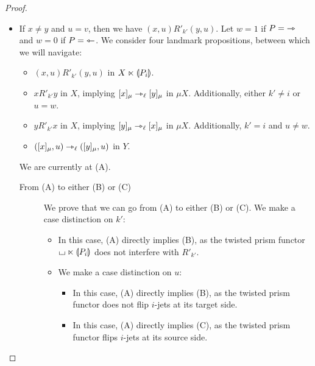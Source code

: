 \documentclass[a4paper]{memoir}
\begin{document}
\begin{proof}
\begin{enumerate}
\begin{itemize}
\begin{itemize}
				\item If $x \neq y$ and $u = v$, then we have $(x, u) \mathrel{R'_{k'}} (y, u)$.
				Let $w = 1$ if $P = {\rightarrowtriangle}$ and $w = 0$ if $P = {\leftarrowtriangle}$.
				We consider four landmark propositions, between which we will navigate:
				\begin{itemize}
					\item[\textbf{(A)}] $(x, u) \mathrel{R'_{k'}} (y, u)$ in $X \ltimes {\llparenthesis P_i \rrparenthesis}$.
					\item[\textbf{(B)}] $x \mathrel{R'_{k'}} y$ in $X$, implying $[x]_\mu \rightarrowtriangle_\ell [y]_\mu$ in $\mu X$. Additionally, either $k' \neq i$ or $u = w$.
					\item[\textbf{(C)}] $y \mathrel{R'_{k'}} x$ in $X$, implying $[y]_\mu \rightarrowtriangle_\ell [x]_\mu$ in $\mu X$. Additionally, $k' = i$ and $u \neq w$.
					\item[\textbf{(D)}] $([x]_\mu, u) \rightarrowtriangle_\ell ([y]_\mu, u)$ in $Y$.
				\end{itemize}
				We are currently at (A).
				\begin{description}
					\item[From (A) to either (B) or (C)]
					We prove that we can go from (A) to either (B) or (C).
					We make a case distinction on $k'$:
					\begin{itemize}
						\item[\framebox{$k' \neq i$}] In this case, (A) directly implies (B), as the twisted prism functor ${\llcorner\hspace{-.4ex}\lrcorner} \ltimes {\llparenthesis P_i \rrparenthesis}$ does not interfere with $R'_{k'}$.
						\item[\framebox{$k' = i$}] We make a case distinction on $u$:
						\begin{itemize}
							\item[\framebox{$u = w$}] In this case, (A) directly implies (B), as the twisted prism functor does not flip $i$-jets at its target side.
							\item[\framebox{$u \neq w$}] In this case, (A) directly implies (C), as the twisted prism functor flips $i$-jets at its source side.
						\end{itemize}
					\end{itemize}
					

\end{description}
\end{itemize}
\end{itemize}
\end{enumerate}
\end{proof}
\end{document}
